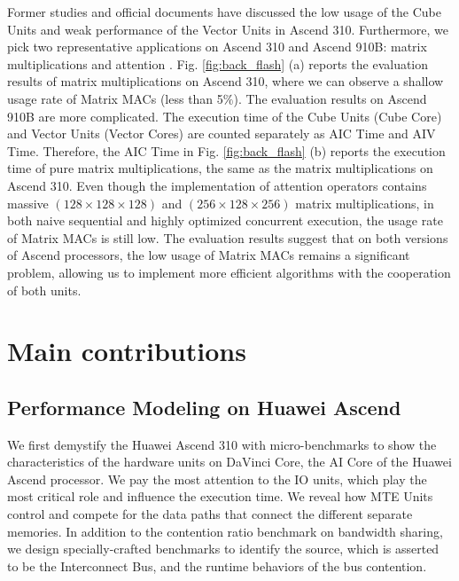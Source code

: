 \documentclass[12pt]{extbook}
\begin{document}
Former studies and official documents \cite{moustafaaccelerating, cann_sugg} have discussed the low usage of the Cube Units and weak performance of the Vector Units in Ascend 310. Furthermore, we pick two representative applications on Ascend 310 and Ascend 910B: matrix multiplications and attention \cite{DBLP:conf/nips/VaswaniSPUJGKP17}. Fig. \ref{fig:back_flash} (a) reports the evaluation results of matrix multiplications on Ascend 310, where we can observe a shallow usage rate of Matrix MACs (less than 5$\%$). The evaluation results on Ascend 910B are more complicated. The execution time of the Cube Units (Cube Core) and Vector Units (Vector Cores) are counted separately as AIC Time and AIV Time. Therefore, the AIC Time in Fig. \ref{fig:back_flash} (b) reports the execution time of pure matrix multiplications, the same as the matrix multiplications on Ascend 310. Even though the implementation of attention operators contains massive $(128 \times 128 \times 128)$ and $(256 \times 128 \times 256)$ matrix multiplications, in both naive sequential and highly optimized concurrent execution, the usage rate of Matrix MACs is still low. The evaluation results suggest that on both versions of Ascend processors, the low usage of Matrix MACs remains a significant problem, allowing us to implement more efficient algorithms with the cooperation of both units.

\section{Main contributions}
\label{sec_1_3_contributions}

\subsection{Performance Modeling on Huawei Ascend}

We first demystify the Huawei Ascend 310 with micro-benchmarks to show the characteristics of the hardware units on DaVinci Core, the AI Core of the Huawei Ascend processor. We pay the most attention to the IO units, which play the most critical role and influence the execution time. We reveal how MTE Units control and compete for the data paths that connect the different separate memories. In addition to the contention ratio benchmark on bandwidth sharing, we design specially-crafted benchmarks to identify the source, which is asserted to be the Interconnect Bus, and the runtime behaviors of the bus contention.
\end{document}
